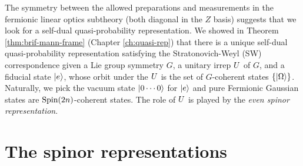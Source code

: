 The symmetry between the allowed preparations and measurements in the fer\-mi\-on\-ic linear optics subtheory (both diagonal in the $Z$ basis) suggests that we look for a self-dual quasi-probability representation. We showed in  Theorem \ref{thm:brif-mann-frame} (Chapter \ref{ch:quasi-rep}) that there is a unique self-dual quasi-probability representation satisfying the Stratonovich-Weyl (SW) correspondence given a Lie group symmetry $G$, a unitary irrep $U$ of $G$, and a fiducial state ${\left\vert{e}\right\rangle}$, whose orbit under the $U$ is the set of $G$-coherent states $\{ {\left\vert{\Omega}\right\rangle} \}$. Naturally, we pick the vacuum state ${\left\vert{0\cdots 0}\right\rangle}$ for ${\left\vert{e}\right\rangle}$ and pure Fermionic Gaussian states are $\text{Spin}(2n)$-coherent states. The role of $U$ is played by the \emph{even spinor representation}.

\section{The spinor representations}\label{ch5:spinor}

